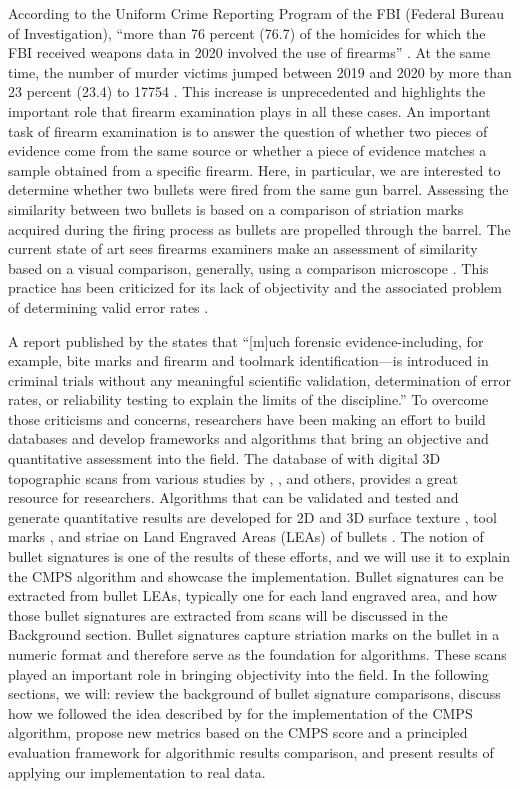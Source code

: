 According to the Uniform Crime Reporting Program of the FBI (Federal
Bureau of Investigation), ``more than 76 percent (76.7) of the homicides
for which the FBI received weapons data in 2020 involved the use of
firearms'' \citep{fbiucr}. At the same time, the number of murder
victims jumped between 2019 and 2020 by more than 23 percent (23.4) to
17754 \citep{fbiucr20}. This increase is unprecedented and highlights
the important role that firearm examination plays in all these cases. An
important task of firearm examination is to answer the question of
whether two pieces of evidence come from the same source or whether a
piece of evidence matches a sample obtained from a specific firearm.
Here, in particular, we are interested to determine whether two bullets
were fired from the same gun barrel. Assessing the similarity between
two bullets is based on a comparison of striation marks acquired during
the firing process as bullets are propelled through the barrel. The
current state of art sees firearms examiners make an assessment of
similarity based on a visual comparison, generally, using a comparison
microscope \citep{afte}. This practice has been criticized for its lack
of objectivity and the associated problem of determining valid error
rates \citep{pcast}.

A report published by the \citet{nrc} states that ``{[}m{]}uch forensic
evidence-including, for example, bite marks and firearm and toolmark
identification---is introduced in criminal trials without any meaningful
scientific validation, determination of error rates, or reliability
testing to explain the limits of the discipline.'' To overcome those
criticisms and concerns, researchers have been making an effort to build
databases and develop frameworks and algorithms that bring an objective
and quantitative assessment into the field. The database of
\citet{nistdb} with digital 3D topographic scans from various studies by
\citet{brundage}, \citet{hamby}, \citet{Hamby:2019} and others, provides
a great resource for researchers. Algorithms that can be validated and
tested and generate quantitative results are developed for 2D and 3D
surface texture \citep{song2005}, tool marks
\citep{ChumbleyL_Scott2010VoTM}, and striae on Land Engraved Areas
(LEAs) of bullets \citep[\citet{pmid30444940}, \citet{cmps}]{aoas}. The
notion of bullet signatures is one of the results of these efforts, and
we will use it to explain the CMPS algorithm and showcase the
 implementation. Bullet signatures can be extracted from
bullet LEAs, typically one for each land engraved area, and how those
bullet signatures are extracted from scans will be discussed in the
Background section. Bullet signatures capture striation marks on the
bullet in a numeric format and therefore serve as the foundation for
algorithms. These scans played an important role in bringing objectivity
into the field. In the following sections, we will: review the
background of bullet signature comparisons, discuss how we followed the
idea described by \citet{cmps} for the implementation of the CMPS
algorithm, propose new metrics based on the CMPS score and a principled
evaluation framework for algorithmic results comparison, and present
results of applying our implementation to real data.

